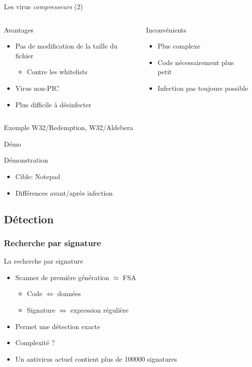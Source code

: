 \documentclass{beamer}
\begin{document}
\begin{frame}{Les virus \textit{compresseurs} (2)}
\begin{columns}[t]
\begin{column}{5cm}
Avantages
\begin{itemize}
\item Pas de modification de la taille du fichier
\begin{itemize}
\item Contre les whitelists
\end{itemize}
\item Virus non-PIC
\item Plus difficile à désinfecter
\end{itemize}
\end{column}
\begin{column}{5cm}
Inconvénients
\begin{itemize}
\item Plus complexe 
\item Code nécessairement plus petit 
\item Infection pas toujours possible
\end{itemize}
\end{column}
\end{columns}
\begin{alertblock}{Exemple}
W32/Redemption, W32/Aldebera
\end{alertblock}
\end{frame}


\begin{frame}{Démo}
\begin{alertblock}{Démonstration}
\begin{itemize}
\item Cible: Notepad
\item Différences avant/après infection
\end{itemize}
\end{alertblock}
\end{frame}

\subsection{Détection}

\subsubsection{Recherche par signature}
\begin{frame}{La recherche par signature}
\begin{itemize}
\item Scanner de première génération $\simeq$ FSA
\begin{itemize}
\item Code $\Leftrightarrow$ données
\item Signature $\Leftrightarrow$ expression régulière
\end{itemize}
\item Permet une détection exacte
\item Complexité ?
\item Un antivirus actuel contient plus de 100000 signatures
\end{itemize}
\end{frame}
\end{document}
